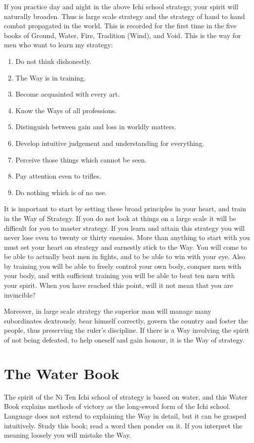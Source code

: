 \documentclass[12pt]{report}
\newcommand{\mychapter}[2]{
\setcounter{chapter}{#1}
    \setcounter{section}{0}
    \chapter*{#2}
    \addcontentsline{toc}{chapter}{#2}
}
\begin{document}
If you practice day and night in the above Ichi school strategy, your spirit will naturally broaden. Thus is large scale strategy and the strategy of hand to hand combat propagated in the world. This is recorded for the first time in the five books of Ground, Water, Fire, Tradition (Wind), and Void. This is the way for men who want to learn my strategy:
\clearpage
\begin{enumerate}
	\item Do not think dishonestly.
	\item The Way is in training.
	\item Become acquainted with every art.
	\item Know the Ways of all professions.
	\item Distinguish between gain and loss in worldly matters.
	\item Develop intuitive judgement and understanding for everything.
	\item Perceive those things which cannot be seen.
	\item Pay attention even to trifles.
	\item Do nothing which is of no use.
\end{enumerate}
It is important to start by setting these broad principles in your heart, and train in the Way of Strategy. If you do not look at things on a large scale it will be difficult for you to master strategy. If you learn and attain this strategy you will never lose even to twenty or thirty enemies. More than anything to start with you must set your heart on strategy and earnestly stick to the Way. You will come to be able to actually beat men in fights, and to be able to win with your eye. Also by training you will be able to freely control your own body, conquer men with your body, and with sufficient training you will be able to beat ten men with your spirit. When you have reached this point, will it not mean that you are invincible?

Moreover, in large scale strategy the superior man will manage many subordinates dextrously, bear himself correctly, govern the country and foster the people, thus preserving the ruler's discipline. If there is a Way involving the spirit of not being defeated, to help oneself and gain honour, it is the Way of strategy.
\mychapter{3}{The Water Book}
The spirit of the Ni Ten Ichi school of strategy is based on water, and this Water Book explains methods of victory as the long-sword form of the Ichi school. Language does not extend to explaining the Way in detail, but it can be grasped intuitively. Study this book; read a word then ponder on it. If you interpret the meaning loosely you will mistake the Way.
\end{document}
